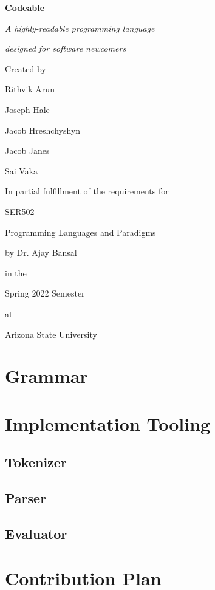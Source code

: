 \documentclass{article}
\begin{document}
    {
        \centering
        
        \textbf{\Huge{Codeable}}
        
        \vspace*{1em}
        \Large{\emph{A highly-readable programming language}}
        
        \Large{\emph{designed for software newcomers}}

        \vspace*{5em}
        \Large{Created by}
        
        \vspace*{1em}
        \normalsize{Rithvik Arun}
        
        Joseph Hale 
        
        Jacob Hreshchyshyn 
        
        Jacob Janes 
        
        Sai Vaka
        
        \vspace*{5em}
        \Large{In partial fulfillment of the requirements for}
        
        \vspace*{1em}
        \normalsize{SER502}
        
        Programming Languages and Paradigms
        
        by Dr. Ajay Bansal
        
        \vspace*{1em}
        in the 
        
        Spring 2022 Semester
        
        \vspace*{1em}
        at

        Arizona State University

    }
    \newpage

    \section{Grammar}
    
    
    \section{Implementation Tooling}
    
    \subsection{Tokenizer}
    \subsection{Parser}
    \subsection{Evaluator}
    
    \section{Contribution Plan}
    
\end{document}
